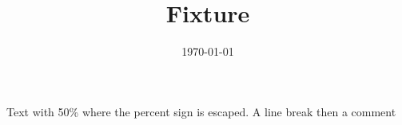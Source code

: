 \documentclass[aps,pra,reprint]{revtex4-2}
\begin{document}
\title{Fixture}
\date{\today}
\maketitle
Text with 50\%  where the percent sign is escaped.
A line break then a comment \\%

\end{document}
